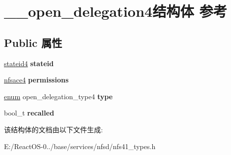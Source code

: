 \hypertarget{struct____open__delegation4}{}\section{\+\_\+\+\_\+open\+\_\+delegation4结构体 参考}
\label{struct____open__delegation4}
\subsection*{Public 属性}
\begin{DoxyCompactItemize}
\item 
\mbox{\label{struct____open__delegation4_a2edb25707dc6fcf343342a05c2fd06a9}} 
\hyperlink{struct____stateid4}{stateid4} {\bfseries stateid}
\item 
\mbox{\label{struct____open__delegation4_ad0ef81fb9f3d90dad6e65e0820e3a3a6}} 
\hyperlink{struct____nfsace4}{nfsace4} {\bfseries permissions}
\item 
\mbox{\label{struct____open__delegation4_ab28d726d67c53ed56f994e23538a9033}} 
\hyperlink{interfaceenum}{enum} open\+\_\+delegation\+\_\+type4 {\bfseries type}
\item 
\mbox{\label{struct____open__delegation4_a2a84c12850c58f43ec5b095ab6de17c3}} 
bool\+\_\+t {\bfseries recalled}
\end{DoxyCompactItemize}


该结构体的文档由以下文件生成\+:\begin{DoxyCompactItemize}
\item 
E\+:/\+React\+O\+S-\/0../base/services/nfsd/nfs41\+\_\+types.\+h\end{DoxyCompactItemize}
